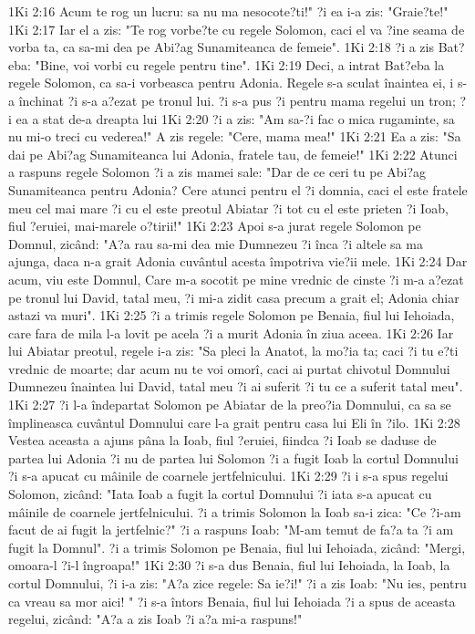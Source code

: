 1Ki 2:16  Acum te rog un lucru: sa nu ma nesocote?ti!" ?i ea i-a zis: "Graie?te!"
1Ki 2:17  Iar el a zis: "Te rog vorbe?te cu regele Solomon, caci el va ?ine seama de vorba ta, ca sa-mi dea pe Abi?ag Sunamiteanca de femeie".
1Ki 2:18  ?i a zis Bat?eba: "Bine, voi vorbi cu regele pentru tine".
1Ki 2:19  Deci, a intrat Bat?eba la regele Solomon, ca sa-i vorbeasca pentru Adonia. Regele s-a sculat înaintea ei, i s-a închinat ?i s-a a?ezat pe tronul lui. ?i s-a pus ?i pentru mama regelui un tron; ?i ea a stat de-a dreapta lui
1Ki 2:20  ?i a zis: "Am sa-?i fac o mica rugaminte, sa nu mi-o treci cu vederea!" A zis regele: "Cere, mama mea!"
1Ki 2:21  Ea a zis: "Sa dai pe Abi?ag Sunamiteanca lui Adonia, fratele tau, de femeie!"
1Ki 2:22  Atunci a raspuns regele Solomon ?i a zis mamei sale: "Dar de ce ceri tu pe Abi?ag Sunamiteanca pentru Adonia? Cere atunci pentru el ?i domnia, caci el este fratele meu cel mai mare ?i cu el este preotul Abiatar ?i tot cu el este prieten ?i Ioab, fiul ?eruiei, mai-marele o?tirii!"
1Ki 2:23  Apoi s-a jurat regele Solomon pe Domnul, zicând: "A?a rau sa-mi dea mie Dumnezeu ?i înca ?i altele sa ma ajunga, daca n-a grait Adonia cuvântul acesta împotriva vie?ii mele.
1Ki 2:24  Dar acum, viu este Domnul, Care m-a socotit pe mine vrednic de cinste ?i m-a a?ezat pe tronul lui David, tatal meu, ?i mi-a zidit casa precum a grait el; Adonia chiar astazi va muri".
1Ki 2:25  ?i a trimis regele Solomon pe Benaia, fiul lui Iehoiada, care fara de mila l-a lovit pe acela ?i a murit Adonia în ziua aceea.
1Ki 2:26  Iar lui Abiatar preotul, regele i-a zis: "Sa pleci la Anatot, la mo?ia ta; caci ?i tu e?ti vrednic de moarte; dar acum nu te voi omorî, caci ai purtat chivotul Domnului Dumnezeu înaintea lui David, tatal meu ?i ai suferit ?i tu ce a suferit tatal meu".
1Ki 2:27  ?i l-a îndepartat Solomon pe Abiatar de la preo?ia Domnului, ca sa se împlineasca cuvântul Domnului care l-a grait pentru casa lui Eli în ?ilo.
1Ki 2:28  Vestea aceasta a ajuns pâna la Ioab, fiul ?eruiei, fiindca ?i Ioab se daduse de partea lui Adonia ?i nu de partea lui Solomon ?i a fugit Ioab la cortul Domnului ?i s-a apucat cu mâinile de coarnele jertfelnicului.
1Ki 2:29  ?i i s-a spus regelui Solomon, zicând: "Iata Ioab a fugit la cortul Domnului ?i iata s-a apucat cu mâinile de coarnele jertfelnicului. ?i a trimis Solomon la Ioab sa-i zica: "Ce ?i-am facut de ai fugit la jertfelnic?" ?i a raspuns Ioab: "M-am temut de fa?a ta ?i am fugit la Domnul". ?i a trimis Solomon pe Benaia, fiul lui Iehoiada, zicând: "Mergi, omoara-l ?i-l îngroapa!"
1Ki 2:30  ?i s-a dus Benaia, fiul lui Iehoiada, la Ioab, la cortul Domnului, ?i i-a zis: "A?a zice regele: Sa ie?i!" ?i a zis Ioab: "Nu ies, pentru ca vreau sa mor aici! " ?i s-a întors Benaia, fiul lui Iehoiada ?i a spus de aceasta regelui, zicând: "A?a a zis Ioab ?i a?a mi-a raspuns!"
